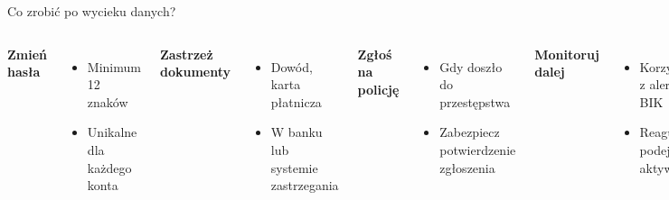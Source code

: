 \begin{frame}{Co zrobić po wycieku danych?}
\begin{columns}[t]
    \textbf{Zmień hasła}
    \begin{itemize}
        \item Minimum 12 znaków
        \item Unikalne dla każdego konta
    \end{itemize}
    \vspace{0.5em}
    \textbf{Zastrzeż dokumenty}
    \begin{itemize}
        \item Dowód, karta płatnicza
        \item W banku lub systemie zastrzegania
    \end{itemize}
    \textbf{Zgłoś na policję}
    \begin{itemize}
        \item Gdy doszło do przestępstwa
        \item Zabezpiecz potwierdzenie zgłoszenia
    \end{itemize}
    \vspace{0.5em}
    \textbf{Monitoruj dalej}
    \begin{itemize}
        \item Korzystaj z alertów BIK
        \item Reaguj na podejrzane aktywności \cite{WYCIEK}
    \end{itemize}
\end{columns}
\end{frame}